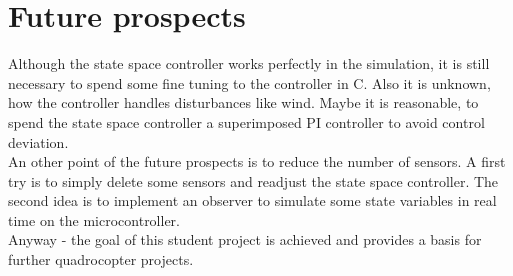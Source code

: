 \section{Future prospects}\label{chapter_FUTUREPROSPECTS}

Although the state space controller works perfectly in the simulation, it is still necessary to spend some fine tuning to the controller in C. Also it is unknown, how the controller handles disturbances like wind. Maybe it is reasonable, to spend the state space controller a superimposed PI controller to avoid control deviation.\\
An other point of the future prospects is to reduce the number of sensors. A first try is to simply delete some sensors and readjust the state space controller. The second idea is to implement an observer to simulate some state variables in real time on the microcontroller.\\
Anyway - the goal of this student project is achieved and provides a basis for further quadrocopter projects.